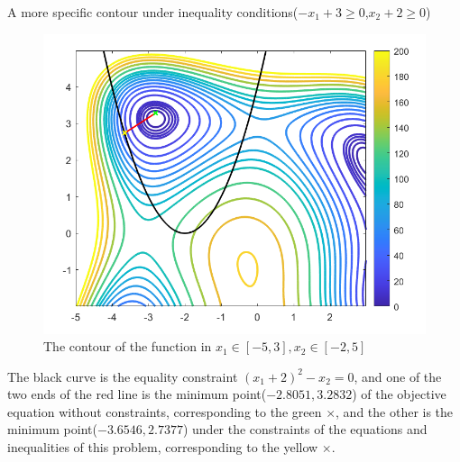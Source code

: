 A more specific contour under inequality conditions($-x_1+3\ge 0$,$x_2+2\ge 0$)
\begin{figure}[H]
\centering
\includegraphics[scale=0.5]{figures/HB_map_ieq.PNG}
\caption{The contour of the function in $x_1\in[-5, 3],x_2\in[-2,5]$}
\label{fig:labe5.4.2}
\end{figure}
The black curve is the equality constraint $\left(x_1+2\right)^2-x_2= 0$, and one of the two ends of the red line is the minimum point($-2.8051,3.2832$) of the objective equation without constraints, corresponding to the green $\times$, and the other is the minimum point($-3.6546,2.7377$) under the constraints of the equations and inequalities of this problem, corresponding to the yellow $\times$.

